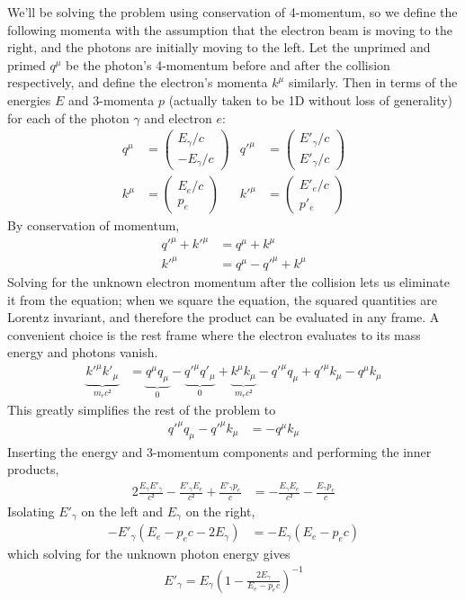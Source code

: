 We'll be solving the problem using conservation of 4-momentum, so we define
the following momenta with the assumption that the electron beam is moving
to the right, and the photons are initially moving to the left. Let the
unprimed and primed $q^μ$ be the photon's 4-momentum before and after the
collision respectively, and define the electron's momenta $k^μ$ similarly.
Then in terms of the energies $E$ and 3-momenta $p$ (actually taken to be 1D
without loss of generality) for each of the photon $γ$ and electron $e$:
\begin{align*}
    q^μ &= \begin{pmatrix} E_γ/c \\ -E_γ/c \end{pmatrix} &
	q'^μ &= \begin{pmatrix} E'_γ/c \\ E'_γ/c \end{pmatrix}
    \\
    k^μ &= \begin{pmatrix} E_e/c \\ p_e \end{pmatrix} &
	k'^μ &= \begin{pmatrix} E'_e/c \\ p'_e \end{pmatrix}    
\end{align*}
By conservation of momentum,
\begin{align*}
    q'^μ + k'^μ &= q^μ + k^μ \\
    k'^μ &= q^μ - q'^μ + k^μ
\end{align*}
Solving for the unknown electron momentum after the collision lets us eliminate
it from the equation; when we square the equation, the squared quantities are
Lorentz invariant, and therefore the product can be evaluated in any frame. A
convenient choice is the rest frame where the electron evaluates to its mass
energy and photons vanish.
\begin{align*}
    \underbrace{k'^μ k'_μ}_{m_e c²} &=
	\underbrace{q^μ q_μ}_{0}
	- \underbrace{q'^μ q'_μ}_{0}
	+ \underbrace{k^μ k_μ}_{m_e c²}
	- q'^μ q_μ + q'^μ k_μ - q^μ k_μ
\end{align*}
This greatly simplifies the rest of the problem to
\begin{align*}
    q'^μ q_μ - q'^μ k_μ &= - q^μ k_μ
\end{align*}
Inserting the energy and 3-momentum components and performing the inner
products,
\begin{align*}
    2\frac{E_γ E'_γ}{c²} - \frac{E'_γ E_e}{c²} + \frac{E'_γ p_e}{c} &=
	-\frac{E_γ E_e}{c²} - \frac{E_γ p_e}{c}
\end{align*}
Isolating $E'_γ$ on the left and $E_γ$ on the right,
\begin{align*}
    -E'_γ (E_e - p_e c - 2E_γ) &= - E_γ(E_e - p_e c)
\end{align*}
which solving for the unknown photon energy gives
\begin{align}
    \boxed{ E'_γ = E_γ (1 - \frac{2E_γ}{E_e - p_e c})^{-1} }
	\label{eqn:2002sp1.7:analytic_soln}
\end{align}

